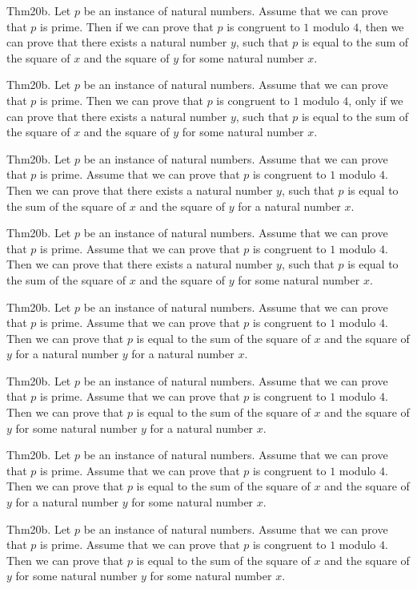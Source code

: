 \documentclass{article}
\begin{document}
Thm20b. Let $p$ be an instance of natural numbers. Assume that we can prove that $p$ is prime. Then if we can prove that $p$ is congruent to $1$ modulo $4$, then we can prove that there exists a natural number $y$, such that $p$ is equal to the sum of the square of $x$ and the square of $y$ for some natural number $x$.

Thm20b. Let $p$ be an instance of natural numbers. Assume that we can prove that $p$ is prime. Then we can prove that $p$ is congruent to $1$ modulo $4$, only if we can prove that there exists a natural number $y$, such that $p$ is equal to the sum of the square of $x$ and the square of $y$ for some natural number $x$.

Thm20b. Let $p$ be an instance of natural numbers. Assume that we can prove that $p$ is prime. Assume that we can prove that $p$ is congruent to $1$ modulo $4$. Then we can prove that there exists a natural number $y$, such that $p$ is equal to the sum of the square of $x$ and the square of $y$ for a natural number $x$.

Thm20b. Let $p$ be an instance of natural numbers. Assume that we can prove that $p$ is prime. Assume that we can prove that $p$ is congruent to $1$ modulo $4$. Then we can prove that there exists a natural number $y$, such that $p$ is equal to the sum of the square of $x$ and the square of $y$ for some natural number $x$.

Thm20b. Let $p$ be an instance of natural numbers. Assume that we can prove that $p$ is prime. Assume that we can prove that $p$ is congruent to $1$ modulo $4$. Then we can prove that $p$ is equal to the sum of the square of $x$ and the square of $y$ for a natural number $y$ for a natural number $x$.

Thm20b. Let $p$ be an instance of natural numbers. Assume that we can prove that $p$ is prime. Assume that we can prove that $p$ is congruent to $1$ modulo $4$. Then we can prove that $p$ is equal to the sum of the square of $x$ and the square of $y$ for some natural number $y$ for a natural number $x$.

Thm20b. Let $p$ be an instance of natural numbers. Assume that we can prove that $p$ is prime. Assume that we can prove that $p$ is congruent to $1$ modulo $4$. Then we can prove that $p$ is equal to the sum of the square of $x$ and the square of $y$ for a natural number $y$ for some natural number $x$.

Thm20b. Let $p$ be an instance of natural numbers. Assume that we can prove that $p$ is prime. Assume that we can prove that $p$ is congruent to $1$ modulo $4$. Then we can prove that $p$ is equal to the sum of the square of $x$ and the square of $y$ for some natural number $y$ for some natural number $x$.
\end{document}

